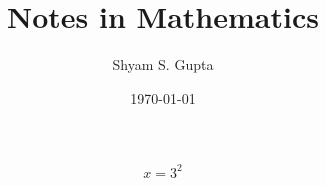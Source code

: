 \documentclass{article}
\title{Notes in Mathematics}
\author{Shyam S. Gupta}
\date{\today}
\begin{document}
	\maketitle

	$$x = 3^2$$
	
\end{document}
